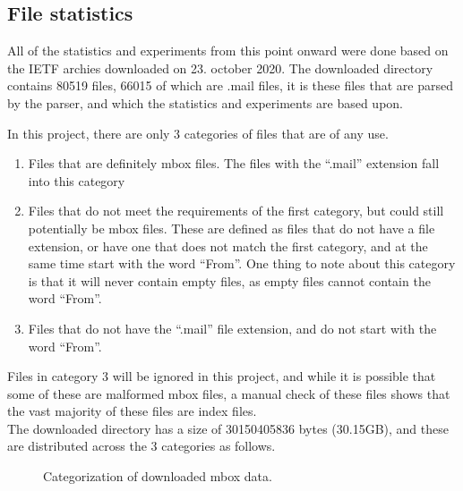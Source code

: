 \documentclass[a4paper,english]{report}
\begin{document}
\subsection{File statistics}
All of the statistics and experiments from this point onward were done based on the IETF archies downloaded on 23. october 2020.
The downloaded directory contains 80519 files, 66015 of which are .mail files, it is these files that are parsed by the parser, and which the statistics and experiments are based upon.

In this project, there are only 3 categories of files that are of any use.

\begin{enumerate}
\item Files that are definitely mbox files. The files with the “.mail” extension fall into this category 

\item Files that do not meet the requirements of the first category, but could still potentially be mbox files. These are defined as files that do not have a  file extension, or have one that does not match the first category, and at the same time start with the word “From”. One thing to note about this category is that it will never contain empty files, as empty files cannot contain the word “From”.

\item Files that do not have the “.mail” file extension, and do not start with the word “From”.

\end{enumerate}


Files in category 3 will be ignored in this project, and while it is possible that some of these are malformed mbox files, a manual check of these files shows that the vast majority of these files are index files.\\
 
The downloaded directory has a size of 30150405836 bytes (30.15GB), and these are distributed across the 3 categories as follows.


\begin{figure}[H]
\caption{Categorization of downloaded mbox data.} \label{fig:f1}
\end{figure}
\end{document}
